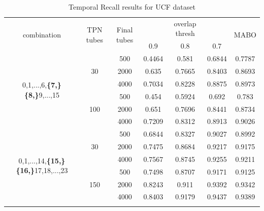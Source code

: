 \documentclass{report}
\newcommand{\en}{\selectlanguage{english}}
\begin{document}
\begin{center}
\en
\begin{longtable}{||c | c | c ||c c c| c|}

  \hline
  \multirow{2}{*}{combination} & \multirow{2}{2.5em}{TPN tubes} & \multirow{2}{2.5em}{Final tubes} &  {} &overlap thresh & {} & \multirow{2}{*}{MABO} \\
  {} & {} & {} &  0.9 &  0.8 & 0.7 & {}\\         
  \hline
  
  
  \multirow{6}{7em}{0,1,...,6,\textbf{\{7,\}}
  \textbf{\{8,\}}9,...,15 }  & \multirow{3}{*}{30} & 500   & 0.4464  & 0.581 & 0.6844  & 0.7787 \\
  \cline{3-7}
  {} &  {}   & 2000   & 0.635  & 0.7665 & 0.8403 & 0.8693 \\
  \cline{3-7}
  {} &  {}   & 4000   & 0.7034  & 0.8228 & 0.8875 & 0.8973 \\
  \cline{2-7}
  {} &  \multirow{3}{*}{100}   & 500   & 0.454 & 0.5924 & 0.692 & 0.783 \\
  \cline{3-7}
  {} &  {}   & 2000   & 0.651 & 0.7696 & 0.8441 &0.8734 \\
  \cline{3-7}
  {} &  {}   & 4000   & 0.7209 &0.8312 & 0.8913 & 0.9026 \\

  \hline                                    
  \multirow{6}{7em}{0,1,...,14,\textbf{\{15,\}}
  \textbf{\{16,\}}17,18,...,23 }  & \multirow{3}{*}{30} & 500   & 0.6844 &0.8327 & 0.9027 & 0.8992 \\
  \cline{3-7}
                                    {} &  {}   & 2000   & 0.7475 & 0.8684 & 0.9217 & 0.9175 \\
  \cline{3-7}
                                    {} &  {}   & 4000   & 0.7567  & 0.8745  & 0.9255 & 0.9211 \\
  \cline{2-7}
                                    {} &  \multirow{3}{*}{150}   & 500   & 0.7498 &0.8707 &0.9171 & 0.9125 \\
  \cline{3-7}
                                    {} &  {}   & 2000   & 0.8243 & 0.911 & 0.9392 & 0.9342\\
  \cline{3-7}
                                    {} &  {}   & 4000   &  0.8403  & 0.9179 & 0.9437 & 0.9389\\
  \hline                                    
  \caption{Temporal Recall results for UCF dataset}
  \label{table:ucf_temp_recall }
\end{longtable} 
\end{center}
\end{document}
